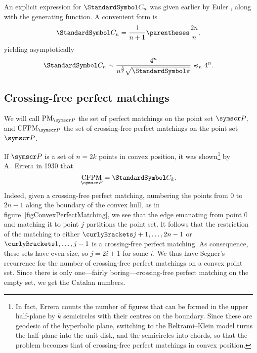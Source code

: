 \documentclass[10pt, a4paper, twoside]{basestyle}
\DeclareMathOperator{\PM}{PM}
\DeclareMathOperator{\CFPM}{CFPM}
\newcommand{\CatalanNumber}[1]{\StandardSymbol C_{#1}}
\newcommand{\pointset}{\symscr}
\begin{document}
An explicit expression for $\CatalanNumber n$ was given earlier by Euler \cite{Euler1751}, along
with the generating function.
A convenient form is\begin{equation}
\CatalanNumber n = \frac{1}{n+1} \binom {2n} {n}\text,
\end{equation}
yielding asymptotically
\begin{equation}
\CatalanNumber n \sim \frac{4^n}{n^{\frac{3}{2}}\sqrt{\Pi}} \preccurlyeq_n 4^n\text.
\end{equation}

\subsection{Crossing-free perfect matchings}
\label{PerfectMatchingsIntro}
We will call $\PM_{\pointset P}$ the set of perfect matchings on the point set $\pointset P$,
and $\CFPM_{\pointset P}$ the set
of crossing-free perfect matchings on the point set $\pointset P$.

If $\pointset P$ is a set of $n=2k$ points in convex position,
it was shown\footnote{In fact, Errera counts the number of figures that can be formed in the upper half-plane by $k$
semicircles with their centres on the boundary. Since these are geodesic of the hyperbolic plane, switching to the
Beltrami--Klein model turns the half-plane into the unit disk, and the semicircles into chords, so that the problem
becomes that of crossing-free perfect matchings in convex position.}
by A.~Errera in 1930 \cite{Errera1931} that\[\CFPM_{\pointset P}=\CatalanNumber k\text.\]
Indeed, given a crossing-free perfect matching,
numbering the points from $0$ to $2n-1$ along the boundary of the convex hull, as in figure~\ref{figConvexPerfectMatching},
we see that the edge emanating from point $0$ and matching it to point $j$ partitions
the point set. It follows that the restriction of the matching to either $\set{j+1,\dotsc,2n-1}$ or
$\set{1,\dotsc,j-1}$ is a crossing-free perfect matching.
As consequence, these sets have even size, so $j=2i+1$ for some $i$.
We thus have Segner's recurrence for the number of crossing-free perfect matchings on a convex point set.
Since there is only one---fairly boring---crossing-free perfect matching on the empty set, we get the Catalan numbers.
\end{document}
